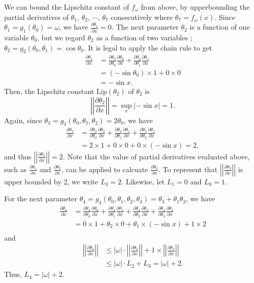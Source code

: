 \documentclass[12pt]{report}
\numberwithin{figure}{chapter}
\theoremstyle{plain}
\theoremstyle{definition}
\theoremstyle{corollary}
\theoremstyle{definition}
\theoremstyle{plain}
\theoremstyle{definition}
\theoremstyle{plain}
\newcommand\lip{\ensuremath{\text{Lip}}}
\newcommand\pa[2]{\ensuremath{\frac{\partial #1}{\partial #2}}}
\newcommand\norm[1]{\ensuremath{\left|\left|#1\right|\right|}}
\begin{document}
We can bound the Lipschitz constant of \(f_\omega\) from above, by upperbounding the partial derivatives of \(\theta_1\), \(\theta_2\), \(\cdots\), \(\theta_7\) consecutively where \(\theta_7=f_\omega(x)\).
Since \(\theta_1=g_1(\theta_0)=\omega\), we have \(\frac{\partial\theta_1}{\partial x}=0\).
The next parameter \(\theta_2\) is a function of one variable \(\theta_0\), but we regard \(\theta_2\) as a function of two variables ; \(\theta_2=g_2(\theta_0,\theta_1)=\cos\theta_0\).
It is legal to apply the chain rule to get
\begin{align*}
\pa{\theta_2}x
&=\pa{\theta_2}{\theta_0}\pa{\theta_0}x+\pa{\theta_2}{\theta_1}\pa{\theta_1}x\\
&=(-\sin\theta_0)\times1+0\times0\\
&=-\sin x.
\end{align*}
Then, the Lipschitz constant \(\lip(\theta_2)\) of \(\theta_2\) is
\[\norm{\pa{\theta_2}x}=\sup_x|-\sin x|=1.\]
Again, since \(\theta_3=g_3(\theta_0,\theta_1,\theta_2)=2\theta_0\), we have
\begin{align*}
\pa{\theta_3}x
&=\pa{\theta_3}{\theta_0}\pa{\theta_0}x+\pa{\theta_3}{\theta_1}\pa{\theta_1}x+\pa{\theta_3}{\theta_2}\pa{\theta_2}x\\
&=2\times1+0\times0+0\times(-\sin x)=2,
\end{align*}
and thus \(\norm{\pa{\theta_2}x}=2\).
Note that the value of partial derivatives evaluated above, such as \pa{\theta_1}x and \pa{\theta_2}x, can be applied to calcuate \pa{\theta_3}x.
To represent that \norm{\pa{\theta_3}x} is upper bounded by 2, we write \(L_3=2\).
Likewise, let \(L_1=0\) and \(L_0=1\).

For the next parameter \(\theta_4=g_4(\theta_0,\theta_1,\theta_2,\theta_3)=\theta_3+\theta_1\theta_2\), we have
\begin{align*}
\pa{\theta_4}x
&=\pa{\theta_4}{\theta_0}\pa{\theta_0}x+\pa{\theta_4}{\theta_1}\pa{\theta_1}x+\pa{\theta_4}{\theta_2}\pa{\theta_2}x
+\pa{\theta_4}{\theta_3}\pa{\theta_3}x\\
&=0\times1+\theta_2\times0+\theta_1\times(-\sin x)+1\times2\\
\end{align*}
and
\begin{align*}
\norm{\pa{\theta_4}x}
&\le|\omega|\cdot\norm{\pa{\theta_2}x}+1\times\norm{\pa{\theta_3}x}\\
&\le|\omega|\cdot L_2+L_3=|\omega|+2.
\end{align*}
Thus, \(L_4=|\omega|+2\).
\end{document}
